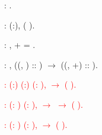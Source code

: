 \documentclass{report}
\begin{document}
\noindent\begin{coqdoccode}
\coqdocemptyline
\coqdocnoindent
{}  :  .\coqdoceol
\coqdocemptyline
\end{coqdoccode}

\begin{coqdoccode}
\coqdocnoindent
{}  : \coqdockw{\ensuremath{\forall}} (:),  ( ).\coqdoceol
\coqdocemptyline
\end{coqdoccode}

\begin{coqdoccode}
\coqdocnoindent
{}  : \coqdockw{\ensuremath{\forall}} ,  +  = .\coqdoceol
\coqdocemptyline
\end{coqdoccode}

\begin{coqdoccode}
\coqdocnoindent
{}  : \coqdockw{\ensuremath{\forall}}    ,  ((, ) :: ) \ensuremath{\rightarrow}  ((, +) :: ).\coqdoceol
\coqdocemptyline
\end{coqdoccode}

\begin{coqdoccode}
\coqdocnoindent
\textcolor{red}{
  : \coqdockw{\ensuremath{\forall}} (:) (:) (: ),   \ensuremath{\rightarrow}  (   ).\coqdoceol
\coqdocemptyline
}
\end{coqdoccode}

\begin{coqdoccode}
\coqdocnoindent
\textcolor{red}{
  : \coqdockw{\ensuremath{\forall}} (: ) (: ),   \ensuremath{\rightarrow}   \ensuremath{\rightarrow}  (  ).\coqdoceol
\coqdocemptyline
}
\end{coqdoccode}

\begin{coqdoccode}
\coqdocnoindent
\textcolor{red}{
 : \coqdockw{\ensuremath{\forall}} (: ) (: ),   \ensuremath{\rightarrow}  (  ).\coqdoceol
\coqdocemptyline
}
\end{coqdoccode}
\end{document}
